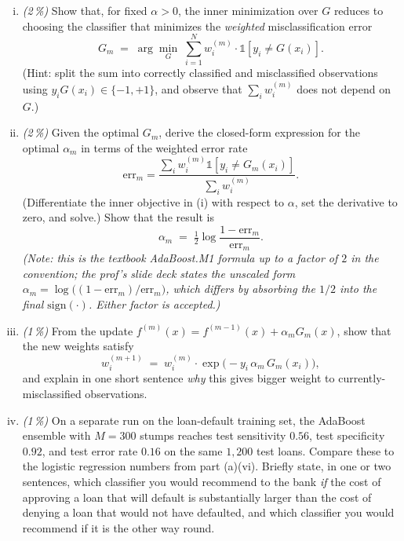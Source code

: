 \documentclass[11pt,a4paper]{article}
\newcommand{\subpoints}[1]{\textit{(#1\,\%)}}
\begin{document}
\begin{enumerate}[(i)]
  \item \subpoints{2} Show that, for fixed $\alpha > 0$, the inner minimization over $G$ reduces to choosing the classifier that minimizes the \emph{weighted} misclassification error
  $$G_m \;=\; \arg\min_{G} \; \sum_{i=1}^{N} w_i^{(m)} \cdot \mathbb{1}[y_i \neq G(x_i)].$$
  (Hint: split the sum into correctly classified and misclassified observations using $y_i G(x_i) \in \{-1, +1\}$, and observe that $\sum_i w_i^{(m)}$ does not depend on $G$.)

  \item \subpoints{2} Given the optimal $G_m$, derive the closed-form expression for the optimal $\alpha_m$ in terms of the weighted error rate
  $$\mathrm{err}_m = \frac{\sum_{i} w_i^{(m)} \mathbb{1}[y_i \neq G_m(x_i)]}{\sum_{i} w_i^{(m)}}.$$
  (Differentiate the inner objective in (i) with respect to $\alpha$, set the derivative to zero, and solve.) Show that the result is
  $$\boxed{\;\alpha_m \;=\; \tfrac{1}{2} \log\!\frac{1 - \mathrm{err}_m}{\mathrm{err}_m}.\;}$$
  \emph{(Note: this is the textbook AdaBoost.M1 formula up to a factor of $2$ in the convention; the prof's slide deck states the unscaled form $\alpha_m = \log\!\bigl((1-\mathrm{err}_m)/\mathrm{err}_m\bigr)$, which differs by absorbing the $1/2$ into the final $\mathrm{sign}(\cdot)$. Either factor is accepted.)}

  \item \subpoints{1} From the update $f^{(m)}(x) = f^{(m-1)}(x) + \alpha_m G_m(x)$, show that the new weights satisfy
  $$w_i^{(m+1)} \;=\; w_i^{(m)} \cdot \exp\!\bigl(-y_i\, \alpha_m\, G_m(x_i)\bigr),$$
  and explain in one short sentence \emph{why} this gives bigger weight to currently-misclassified observations.

  \item \subpoints{1} On a separate run on the loan-default training set, the AdaBoost ensemble with $M = 300$ stumps reaches test sensitivity $0.56$, test specificity $0.92$, and test error rate $0.16$ on the same $1{,}200$ test loans. Compare these to the logistic regression numbers from part (a)(vi). Briefly state, in one or two sentences, which classifier you would recommend to the bank \emph{if} the cost of approving a loan that will default is substantially larger than the cost of denying a loan that would not have defaulted, and which classifier you would recommend if it is the other way round.
\end{enumerate}
\end{document}
